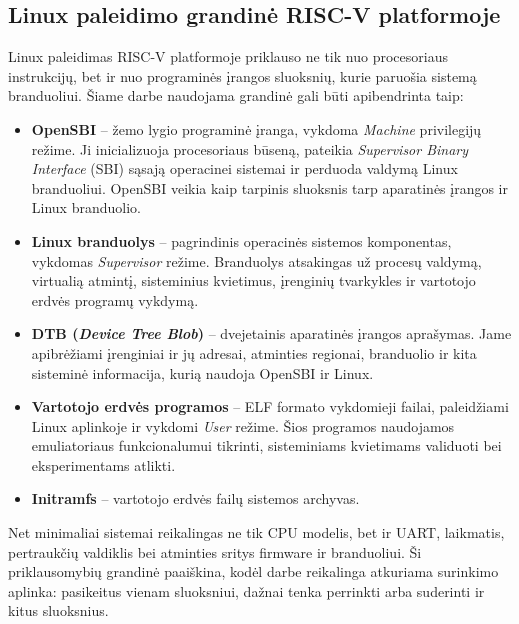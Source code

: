 \subsection{Linux paleidimo grandinė RISC-V platformoje}
\label{subsec:linux-paleidimo-grandine}

Linux paleidimas RISC-V platformoje priklauso ne tik nuo procesoriaus instrukcijų, bet ir nuo programinės įrangos sluoksnių, kurie paruošia sistemą branduoliui. Šiame darbe naudojama grandinė gali būti apibendrinta taip:

\begin{itemize}
    \item \textbf{OpenSBI} -- žemo lygio programinė įranga, vykdoma \textit{Machine} privilegijų režime. Ji inicializuoja procesoriaus būseną, pateikia \textit{Supervisor Binary Interface} (SBI) sąsają operacinei sistemai ir perduoda valdymą Linux branduoliui. OpenSBI veikia kaip tarpinis sluoksnis tarp aparatinės įrangos ir Linux branduolio.

    \item \textbf{Linux branduolys} -- pagrindinis operacinės sistemos komponentas, vykdomas \textit{Supervisor} režime. Branduolys atsakingas už procesų valdymą, virtualią atmintį, sisteminius kvietimus, įrenginių tvarkykles ir vartotojo erdvės programų vykdymą.

    \item \textbf{DTB (\textit{Device Tree Blob})} -- dvejetainis aparatinės įrangos aprašymas. Jame apibrėžiami įrenginiai ir jų adresai, atminties regionai, branduolio ir kita sisteminė informacija, kurią naudoja OpenSBI ir Linux.

    \item \textbf{Vartotojo erdvės programos} -- ELF formato vykdomieji failai, paleidžiami Linux aplinkoje ir vykdomi \textit{User} režime. Šios programos naudojamos emuliatoriaus funkcionalumui tikrinti, sisteminiams kvietimams validuoti bei eksperimentams atlikti.

    \item \textbf{Initramfs} -- vartotojo erdvės failų sistemos archyvas.

\end{itemize}

Net minimaliai sistemai reikalingas ne tik CPU modelis, bet ir UART, laikmatis, pertraukčių valdiklis bei atminties sritys firmware ir branduoliui. Ši priklausomybių grandinė paaiškina, kodėl darbe reikalinga atkuriama surinkimo aplinka: pasikeitus vienam sluoksniui, dažnai tenka perrinkti arba suderinti ir kitus sluoksnius.
